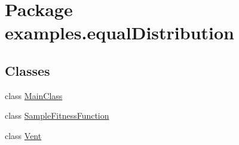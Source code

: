 \hypertarget{namespaceexamples_1_1equal_distribution}{\section{Package examples.\-equal\-Distribution}
\label{namespaceexamples_1_1equal_distribution}
}
\subsection*{Classes}
\begin{DoxyCompactItemize}
\item 
class \hyperlink{classexamples_1_1equal_distribution_1_1_main_class}{Main\-Class}
\item 
class \hyperlink{classexamples_1_1equal_distribution_1_1_sample_fitness_function}{Sample\-Fitness\-Function}
\item 
class \hyperlink{classexamples_1_1equal_distribution_1_1_vent}{Vent}
\end{DoxyCompactItemize}
